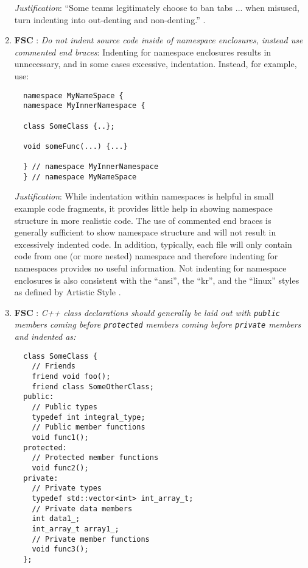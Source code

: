 \begin{enumerate}
{}\textit{Justification}: ``Some teams legitimately choose to ban tabs
... when misused, turn indenting into out-denting and non-denting.''
{}\cite[Item 0]{C++CodingStandards05}.

{}\item{}\textbf{FSC }:
{}\textit{Do not indent source code inside of namespace enclosures,
instead use commented end braces}: Indenting for namespace enclosures results
in unnecessary, and in some cases excessive, indentation.  Instead, for
example, use:

{\small\begin{verbatim}
  namespace MyNameSpace {
  namespace MyInnerNamespace {

  class SomeClass {..};

  void someFunc(...) {...}

  } // namespace MyInnerNamespace
  } // namespace MyNameSpace
\end{verbatim}}

{}\textit{Justification}: While indentation within namespaces is helpful in
small example code fragments, it provides little help in showing namespace
structure in more realistic code.  The use of commented end braces is
generally sufficient to show namespace structure and will not result in
excessively indented code.  In addition, typically, each file will only
contain code from one (or more nested) namespace and therefore indenting for
namespaces provides no useful information.  Not indenting for namespace
enclosures is also consistent with the ``ansi'', the ``kr'', and the ``linux''
styles as defined by Artistic Style {}\cite{ArtisticStyle}.

{}\item{}\textbf{FSC }:
{}\textit{C++ class declarations should generally be laid out with
{}\texttt{public} members coming before {}\texttt{protected} members coming
before {}\texttt{private} members and indented as:}

{\small\begin{verbatim}
  class SomeClass {
    // Friends
    friend void foo();
    friend class SomeOtherClass;
  public:
    // Public types
    typedef int integral_type;
    // Public member functions
    void func1();
  protected:
    // Protected member functions
    void func2();
  private:
    // Private types
    typedef std::vector<int> int_array_t;
    // Private data members
    int data1_;
    int_array_t array1_;
    // Private member functions
    void func3();
  };
\end{verbatim}}


\end{enumerate}
